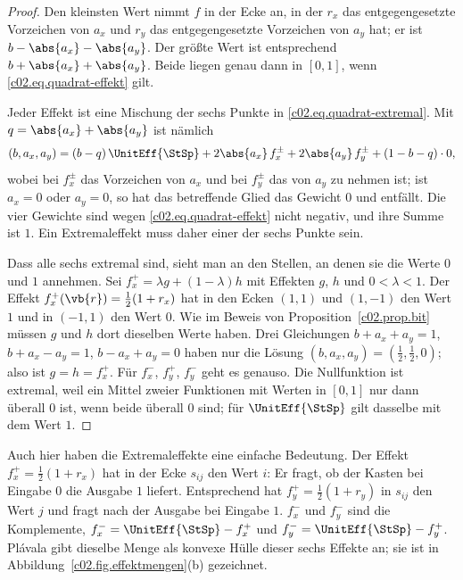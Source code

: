 \begin{proof}
  Den kleinsten Wert nimmt $f$ in der Ecke an, in der $r_x$ das entgegengesetzte
  Vorzeichen von $a_x$ und $r_y$ das entgegengesetzte Vorzeichen von $a_y$ hat; er ist
  $b - \abs{a_x} - \abs{a_y}$. Der größte Wert ist entsprechend
  $b + \abs{a_x} + \abs{a_y}$. Beide liegen genau dann in $[0,1]$, wenn
  \eqref{c02.eq.quadrat-effekt} gilt.

  Jeder Effekt ist eine Mischung der sechs Punkte in \eqref{c02.eq.quadrat-extremal}. Mit
  $q = \abs{a_x} + \abs{a_y}$ ist nämlich
  \begin{equation*}
    (b, a_x, a_y) = (b - q)\,\UnitEff{\StSp} + 2\abs{a_x}\, f_x^{\pm} + 2\abs{a_y}\, f_y^{\pm} + (1 - b - q)\cdot 0 ,
  \end{equation*}
  wobei bei $f_x^{\pm}$ das Vorzeichen von $a_x$ und bei $f_y^{\pm}$ das von $a_y$ zu nehmen
  ist; ist $a_x = 0$ oder $a_y = 0$, so hat das betreffende Glied das Gewicht $0$ und
  entfällt. Die vier Gewichte sind wegen \eqref{c02.eq.quadrat-effekt} nicht negativ, und ihre
  Summe ist $1$. Ein Extremaleffekt muss daher einer der sechs Punkte sein.

  Dass alle sechs extremal sind, sieht man an den Stellen, an denen sie die Werte $0$ und
  $1$ annehmen. Sei $f_x^{+} = \lambda g + (1-\lambda) h$ mit Effekten $g$, $h$ und
  $0 < \lambda < 1$. Der Effekt $f_x^{+}(\vb{r}) = \tfrac12(1 + r_x)$ hat in den Ecken
  $(1,1)$ und $(1,-1)$ den Wert $1$ und in $(-1,1)$ den Wert $0$. Wie im Beweis von
  Proposition~\ref{c02.prop.bit} müssen $g$ und $h$ dort dieselben Werte haben. Drei
  Gleichungen $b + a_x + a_y = 1$, $b + a_x - a_y = 1$, $b - a_x + a_y = 0$ haben nur die
  Lösung $(b, a_x, a_y) = (\tfrac12, \tfrac12, 0)$; also ist $g = h = f_x^{+}$. Für
  $f_x^{-}$, $f_y^{+}$, $f_y^{-}$ geht es genauso. Die Nullfunktion ist extremal, weil ein
  Mittel zweier Funktionen mit Werten in $[0,1]$ nur dann überall $0$ ist, wenn beide
  überall $0$ sind; für $\UnitEff{\StSp}$ gilt dasselbe mit dem Wert $1$.
\end{proof}

Auch hier haben die Extremaleffekte eine einfache Bedeutung. Der Effekt
$f_x^{+} = \tfrac12(1 + r_x)$ hat in der Ecke $s_{ij}$ den Wert $i$: Er fragt, ob der
Kasten bei Eingabe $0$ die Ausgabe $1$ liefert. Entsprechend hat
$f_y^{+} = \tfrac12(1 + r_y)$ in $s_{ij}$ den Wert $j$ und fragt nach der Ausgabe bei
Eingabe $1$. $f_x^{-}$ und $f_y^{-}$ sind die Komplemente, $f_x^{-} = \UnitEff{\StSp} - f_x^{+}$
und $f_y^{-} = \UnitEff{\StSp} - f_y^{+}$. Plávala gibt dieselbe Menge als konvexe Hülle
dieser sechs Effekte an; sie ist in Abbildung~\ref{c02.fig.effektmengen}(b) gezeichnet.

